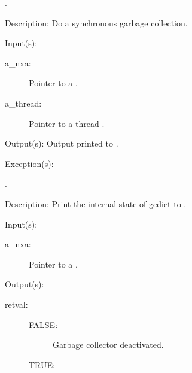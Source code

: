 \begin{capi}
\begin{capilist}
		\begin{description}\item[]
		\item[.]
		\end{description}
	\item[Description: ]
		Do a synchronous garbage collection.
	\end{capilist}
\label{nxa_dump}
	\begin{capilist}
	\item[Input(s): ]
		\begin{description}\item[]
		\item[a\_nxa: ]
			Pointer to a .
		\item[a\_thread: ]
			Pointer to a thread .
		\end{description}
	\item[Output(s): ]
		Output printed to .
	\item[Exception(s): ]
		\begin{description}\item[]
		\item[.]
		\end{description}
	\item[Description: ]
		Print the internal state of gcdict to .
	\end{capilist}
\label{nxa_active_get}
	\begin{capilist}
	\item[Input(s): ]
		\begin{description}\item[]
		\item[a\_nxa: ]
			Pointer to a \classname{nxa}.
		\end{description}
	\item[Output(s): ]
		\begin{description}\item[]
		\item[retval: ]
			\begin{description}\item[]
			\item[FALSE: ]
				Garbage collector deactivated.
			\item[TRUE: ]

\end{description}
\end{description}
\end{capilist}
\end{capi}
